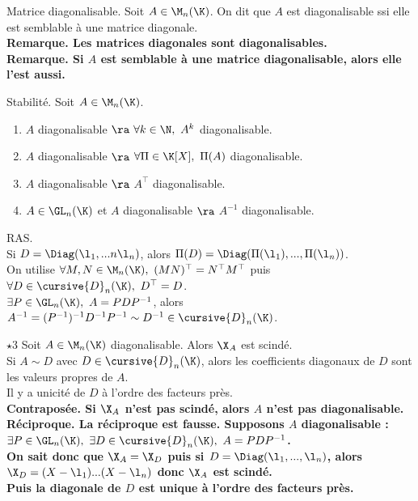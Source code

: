 \documentclass[11pt]{article}
\renewcommand*{\D}{\cursive{D}}
\begin{document}
\begin{defi}{Matrice diagonalisable.}{}
    Soit $A\in\M_n(\K)$. On dit que $A$ est diagonalisable ssi elle est semblable à une matrice diagonale.\\
    \bf{Remarque.} Les matrices diagonales sont diagonalisables.\\
    \bf{Remarque.} Si $A$ est semblable à une matrice diagonalisable, alors elle l'est aussi.
\end{defi}

\begin{prop}{Stabilité.}{}
    Soit $A\in\M_n(\K)$.
    \begin{enumerate}
        \item $A$ diagonalisable $\ra$ $\forall k \in \N, ~ A^k$ diagonalisable.
        \item $A$ diagonalisable $\ra$ $\forall \Pi \in \K[X], ~ \Pi(A)$ diagonalisable.
        \item $A$ diagonalisable $\ra$ $A^\top$ diagonalisable.
        \item $A\in\GL_n(\K)$ et $A$ diagonalisable $\ra$ $A^{-1}$ diagonalisable.
    \end{enumerate}
    \tcblower
     RAS.\\
     Si $D=\Diag(\l_1,...n\l_n)$, alors $\Pi(D)=\Diag(\Pi(\l_1),...,\Pi(\l_n))$.\\
     On utilise $\forall M,N\in\M_n(\K), ~ (MN)^\top=N^\top M^\top$ puis $\forall D \in \D_n(\K), ~ D^\top=D$.\\
     $\exists P\in\GL_n(\K), ~ A=PDP^{-1}$, alors $A^{-1}=(P^{-1})^{-1}D^{-1}P^{-1}\sim D^{-1}\in\D_n(\K)$.
\end{prop}

\begin{prop}{$\star$}{3}
    Soit $A\in\M_n(\K)$ diagonalisable. Alors $\X_A$ est scindé.\\
    Si $A\sim D$ avec $D\in\D_n(\K)$, alors les coefficients diagonaux de $D$ sont les valeurs propres de $A$.\\
    Il y a unicité de $D$ à l'ordre des facteurs près.\\
    \bf{Contraposée.} Si $\X_A$ n'est pas scindé, alors $A$ n'est pas diagonalisable.\\
    \bf{Réciproque.} La réciproque est fausse.
    \tcblower
    Supposons $A$ diagonalisable : $\exists P \in \GL_n(\K), ~ \exists D \in \D_n(\K), ~ A=PDP^{-1}$.\\
    On sait donc que $\X_A=\X_D$ puis si $D=\Diag(\l_1,...,\l_n)$, alors $\X_D=(X-\l_1)...(X-\l_n)$ donc $\X_A$ est scindé.\\
    Puis la diagonale de $D$ est unique à l'ordre des facteurs près.
\end{prop}
\end{document}
